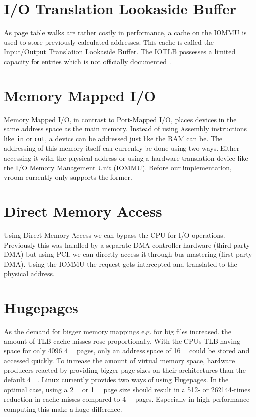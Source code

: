 \section{I/O Translation Lookaside Buffer}
As page table walks are rather costly in performance, a cache on the IOMMU is used to store previously calculated addresses. This cache is called the Input/Output Translation Lookaside Buffer. The IOTLB possesses a limited capacity for entries which is not officially documented \cite{iommuhuber}.

\section{Memory Mapped I/O}
Memory Mapped I/O, in contrast to Port-Mapped I/O, places devices in the same address space as the main memory. Instead of using Assembly instructions like \texttt{in} or \texttt{out}, a device can be addressed just like the RAM can be. The addressing of this memory itself can currently be done using two ways. Either accessing it with the physical address or using a hardware translation device like the I/O Memory Management Unit (IOMMU). Before our implementation, vroom currently only supports the former.

\section{Direct Memory Access}
Using Direct Memory Access we can bypass the CPU for I/O operations. Previously this was handled by a separate DMA-controller hardware (third-party DMA) but using PCI, we can directly access it through bus mastering (first-party DMA). Using the IOMMU the request gets intercepted and translated to the physical address.

\section{Hugepages}
As the demand for bigger memory mappings e.g. for big files increased, the amount of TLB cache misses rose proportionally. With the CPUs TLB having space for only 4096 \qty{4}{\kibi\byte} pages, only an address space of \qty{16}{\mebi\byte} could be stored and accessed quickly. To increase the amount of virtual memory space, hardware producers reacted by providing bigger page sizes on their architectures than the default \qty{4}{\kibi\byte}.
Linux currently provides two ways of using Hugepages.
In the optimal case, using a \qty{2}{\mebi\byte} or \qty{1}{\gibi\byte} page size should result in a 512- or 262144-times reduction in cache misses compared to \qty{4}{\kibi\byte} pages. Especially in high-performance computing this make a huge difference.

